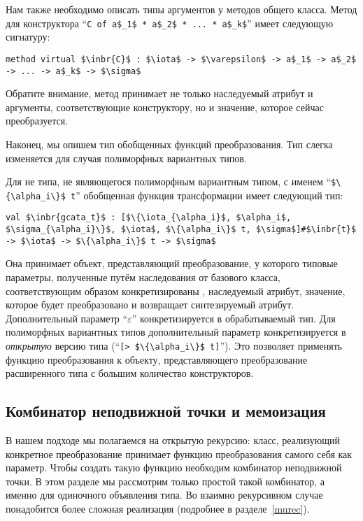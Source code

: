 Нам также необходимо описать типы аргументов у методов общего класса. Метод для конструктора  ``\lstinline|C of a$_1$ * a$_2$ * ... * a$_k$|'' имеет следующую сигнатуру:

\begin{lstlisting}
method virtual $\inbr{C}$ : $\iota$ -> $\varepsilon$ -> a$_1$ -> a$_2$ -> ... -> a$_k$ -> $\sigma$
\end{lstlisting}

Обратите внимание, метод принимает не только наследуемый атрибут и аргументы, соответствующие конструктору, но и значение, которое сейчас преобразуется.

Наконец, мы опишем тип обобщенных функций преобразования. Тип слегка изменяется для случая полиморфных вариантных типов.


Для не типа, не являющегося полиморфным вариантным типом, с именем ``\lstinline|$\{\alpha_i\}$ t|'' обобщенная функция трансформации имеет следующий тип:

\begin{lstlisting}
val $\inbr{gcata_t}$ : [$\{\iota_{\alpha_i}$, $\alpha_i$, $\sigma_{\alpha_i}\}$, $\iota$, $\{\alpha_i\}$ t, $\sigma$]#$\inbr{t}$ -> $\iota$ -> $\{\alpha_i\}$ t -> $\sigma$
\end{lstlisting}

Она принимает объект, представляющий преобразование, у которого типовые параметры, полученные путём наследования от базового класса, соответствующим образом конкретизированы , наследуемый атрибут, значение, которое будет преобразовано и возвращает синтезируемый атрибут.
Дополнительный параметр ``$\varepsilon$'' конкретизируется в обрабатываемый тип. 
Для полиморфных вариантных типов дополнительный параметр конкретизируется в \emph{открытую}
версию типа  (``\lstinline|[> $\{\alpha_i\}$ t]|''). 
Это позволяет применять функцию преобразования к объекту, представляющего преобразование расширенного типа с большим количество конструкторов.


\subsection{Комбинатор неподвижной точки и мемоизация}
\label{memofix}

В нашем подходе мы полагаемся  на открытую рекурсию: класс, реализующий конкретное преобразование принимает функцию преобразования самого себя как параметр.
Чтобы создать такую функцию необходим комбинатор неподвижной точки. В  этом разделе
мы рассмотрим только простой такой комбинатор, а именно для одиночного объявления типа.
Во взаимно рекурсивном случае понадобится более сложная реализация (подробнее в 
разделе~\ref{murec}).

